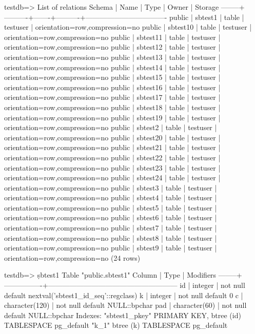 \documentclass{article}
\begin{document}
\begin{markdown}
testdb=> \dt
                            List of relations
 Schema |   Name   | Type  |  Owner   |             Storage              
--------+----------+-------+----------+----------------------------------
 public | sbtest1  | table | testuser | {orientation=row,compression=no}
 public | sbtest10 | table | testuser | {orientation=row,compression=no}
 public | sbtest11 | table | testuser | {orientation=row,compression=no}
 public | sbtest12 | table | testuser | {orientation=row,compression=no}
 public | sbtest13 | table | testuser | {orientation=row,compression=no}
 public | sbtest14 | table | testuser | {orientation=row,compression=no}
 public | sbtest15 | table | testuser | {orientation=row,compression=no}
 public | sbtest16 | table | testuser | {orientation=row,compression=no}
 public | sbtest17 | table | testuser | {orientation=row,compression=no}
 public | sbtest18 | table | testuser | {orientation=row,compression=no}
 public | sbtest19 | table | testuser | {orientation=row,compression=no}
 public | sbtest2  | table | testuser | {orientation=row,compression=no}
 public | sbtest20 | table | testuser | {orientation=row,compression=no}
 public | sbtest21 | table | testuser | {orientation=row,compression=no}
 public | sbtest22 | table | testuser | {orientation=row,compression=no}
 public | sbtest23 | table | testuser | {orientation=row,compression=no}
 public | sbtest24 | table | testuser | {orientation=row,compression=no}
 public | sbtest3  | table | testuser | {orientation=row,compression=no}
 public | sbtest4  | table | testuser | {orientation=row,compression=no}
 public | sbtest5  | table | testuser | {orientation=row,compression=no}
 public | sbtest6  | table | testuser | {orientation=row,compression=no}
 public | sbtest7  | table | testuser | {orientation=row,compression=no}
 public | sbtest8  | table | testuser | {orientation=row,compression=no}
 public | sbtest9  | table | testuser | {orientation=row,compression=no}
(24 rows)

testdb=> \d sbtest1
                             Table "public.sbtest1"
 Column |      Type      |                      Modifiers                       
--------+----------------+------------------------------------------------------
 id     | integer        | not null default nextval('sbtest1_id_seq'::regclass)
 k      | integer        | not null default 0
 c      | character(120) | not null default NULL::bpchar
 pad    | character(60)  | not null default NULL::bpchar
Indexes:
    "sbtest1_pkey" PRIMARY KEY, btree (id) TABLESPACE pg_default
    "k_1" btree (k) TABLESPACE pg_default


\end{markdown}
\end{document}
